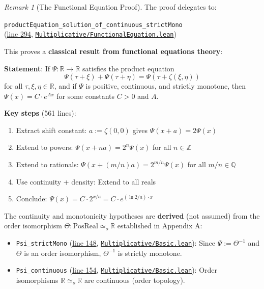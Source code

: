 \documentclass[11pt]{article}
\theoremstyle{definition}
\theoremstyle{remark}
\newtheorem{remark}[theorem]{Remark}
\begin{document}
\begin{remark}[The Functional Equation Proof]
The proof delegates to:

\texttt{productEquation\_solution\_of\_continuous\_strictMono}
\\
(\href{https://github.com/zariuq/ks-foundations-of-inference/blob/main/KnuthSkilling/Multiplicative/FunctionalEquation.lean\#L294}{line 294}, \href{https://github.com/zariuq/ks-foundations-of-inference/blob/main/KnuthSkilling/Multiplicative/FunctionalEquation.lean}{\texttt{Multiplicative/FunctionalEquation.lean}})

This proves a \textbf{classical result from functional equations theory}:

\textbf{Statement}: If $\Psi : \mathbb{R} \to \mathbb{R}$ satisfies the product equation
\[ \Psi(\tau + \xi) + \Psi(\tau + \eta) = \Psi(\tau + \zeta(\xi, \eta)) \]
for all $\tau, \xi, \eta \in \mathbb{R}$, and if $\Psi$ is positive, continuous, and strictly monotone, then $\Psi(x) = C \cdot e^{Ax}$ for some constants $C > 0$ and $A$.

\textbf{Key steps} (561 lines):
\begin{enumerate}
\item Extract shift constant: $a := \zeta(0,0)$ gives $\Psi(x+a) = 2\Psi(x)$
\item Extend to powers: $\Psi(x + na) = 2^n \Psi(x)$ for all $n \in \mathbb{Z}$
\item Extend to rationals: $\Psi(x + (m/n)a) = 2^{m/n} \Psi(x)$ for all $m/n \in \mathbb{Q}$
\item Use continuity + density: Extend to all reals
\item Conclude: $\Psi(x) = C \cdot 2^{x/a} = C \cdot e^{(\ln 2/a) \cdot x}$
\end{enumerate}

The continuity and monotonicity hypotheses are \textbf{derived} (not assumed) from the order isomorphism $\Theta : \text{PosReal} \simeq_o \mathbb{R}$ established in Appendix A:

\begin{itemize}
\item \texttt{Psi\_strictMono} (\href{https://github.com/zariuq/ks-foundations-of-inference/blob/main/KnuthSkilling/Multiplicative/Basic.lean\#L148}{line 148}, \href{https://github.com/zariuq/ks-foundations-of-inference/blob/main/KnuthSkilling/Multiplicative/Basic.lean}{\texttt{Multiplicative/Basic.lean}}): Since $\Psi := \Theta^{-1}$ and $\Theta$ is an order isomorphism, $\Theta^{-1}$ is strictly monotone.
\item \texttt{Psi\_continuous} (\href{https://github.com/zariuq/ks-foundations-of-inference/blob/main/KnuthSkilling/Multiplicative/Basic.lean\#L154}{line 154}, \href{https://github.com/zariuq/ks-foundations-of-inference/blob/main/KnuthSkilling/Multiplicative/Basic.lean}{\texttt{Multiplicative/Basic.lean}}): Order isomorphisms $\mathbb{R} \simeq_o \mathbb{R}$ are continuous (order topology).
\end{itemize}
\end{remark}
\end{document}

